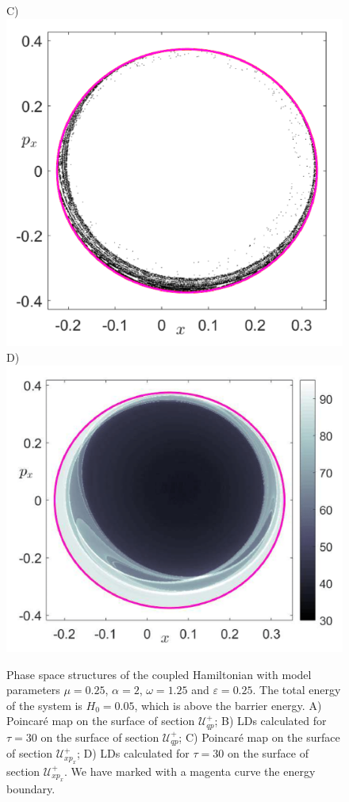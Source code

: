 \documentclass[8pt]{article}
\begin{document}
\begin{figure}[!ht]
\begin{center}
		C)\includegraphics[scale=0.12]{fig12c.png}
		D)\includegraphics[scale=0.12]{fig12d.png}
	\end{center}	
	\caption{Phase space structures of the coupled Hamiltonian with model parameters $\mu = 0.25$, $\alpha = 2$, $\omega = 1.25$ and $\varepsilon = 0.25$. The total energy of the system is $H_0 = 0.05$,	which is above the barrier energy. A) Poincar\'e map on the surface of section $\mathcal{U}^{+}_{qp}$; B) LDs calculated for $\tau = 30$ on the surface of section $\mathcal{U}^{+}_{qp}$; C) Poincar\'e map on the surface of section $\mathcal{U}^{+}_{xp_x}$; D) LDs calculated for $\tau = 30$ on the surface of section $\mathcal{U}^{+}_{xp_x}$. We have marked with a magenta curve the energy boundary.}
	\label{fig:ps_vs_ld_2}
\end{figure}
\end{document}
